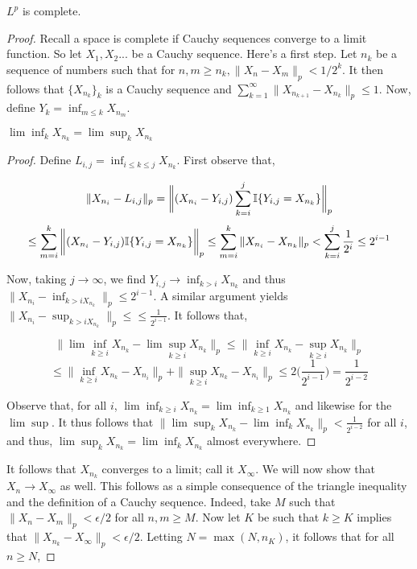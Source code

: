     \begin{theorem}
        $L^p$ is complete.
    \end{theorem}
    \begin{proof}
        Recall a space is complete if Cauchy sequences converge to a limit function. So let 
        $X_1, X_2...$ be a Cauchy sequence. Here's a first step. Let 
        $n_k$ be a sequence of numbers such that for $n,m \geq n_k, \|X_n - X_m\|_p < 1/2^k$. 
        It then follows that $\{X_{n_k}\}_k$ is a Cauchy sequence and $\sum_{k=1}^\infty \|X_{n_{k+1}} - X_{n_k}\|_p \leq 1$. Now, define $Y_k = \inf_{m\leq k}X_{n_m}$. 


        \begin{Proposition} 
            $\lim\inf_k X_{n_k} = \lim\sup_k X_{n_k}$
        \end{Proposition}
        \begin{proof}
            Define $L_{i,j} = \inf_{i \leq k \leq j}X_{n_k}$. First observe that, 

            \[ \|X_{n_i} - L_{i,j}\|_p = \bigg \|(X_{n_i} - Y_{i,j}) \sum_{k=i}^j \mathbb I\{Y_{i,j} = X_{n_k}\}\bigg \|_p  \]
            \[ \leq \sum_{m=i}^k \bigg\| (X_{n_i} - Y_{i,j})\mathbb I\{Y_{i,j} = X_{n_k}\}\bigg\|_p \leq \sum_{m=i}^k \| X_{n_i} - X_{n_k}\|_p < \sum_{k=i}^j \frac{1}{2^i} \leq 2^{i-1}  \]

            Now, taking $j \to \infty$, we find $Y_{i,j} \to \inf_{k > i} X_{n_k}$ and thus $\|X_{n_i} - \inf_{k > i X_{n_k}}\|_p \leq 2^{i-1}$. 
            A similar argument yields $\|X_{n_i} - \sup_{k > i X_{n_k}}\|_p \leq \leq \frac{1}{2^{i-1}}$. 
            It follows that, 

            \[ \|\lim\inf_{k \geq i}X_{n_k} - \lim\sup_{k \geq i}X_{n_k}\|_p \leq \|\inf_{k \geq i}X_{n_k} - \sup_{k \geq i}X_{n_k}\|_p \]
            \[\leq \|\inf_{k \geq i}X_{n_k} - X_{n_i}\|_p + \|\sup_{k \geq i}X_{n_k} - X_{n_i}\|_p \leq 2\bigg(\frac{1}{2^{i-1}}\bigg)  = \frac{1}{2^{i-2}} \]

            Observe that, for all $i$, $\lim\inf_{k \geq i}X_{n_k} = \lim\inf_{k \geq 1}X_{n_k}$ and likewise for the 
            $\lim\sup$. It thus follows that $\|\lim\sup_{k}X_{n_k} - \lim\inf_k X_{n_k}\|_p < \frac{1}{2^{i-2}}$ for all $i$, and thus, 
            $\lim\sup_{k}X_{n_k} = \lim\inf_k X_{n_k}$ almost everywhere.
        \end{proof}
        
        It follows that $X_{n_k}$ converges to a limit; call it $X_\infty$. We 
        will now show that $X_{n} \to X_\infty$ as well. This follows as a simple 
        consequence of the triangle inequality and the definition of a Cauchy sequence. 
        Indeed, take $M$ such that $\|X_n - X_m\|_p < \epsilon / 2$ for all $n,m \geq M$. Now let 
        $K$ be such that $k \geq K$ implies that $\|X_{n_k} - X_\infty\|_p < \epsilon / 2$. Letting 
        $N = \max(N,n_K)$, it follows that for all $n \geq N$,


\end{proof}
